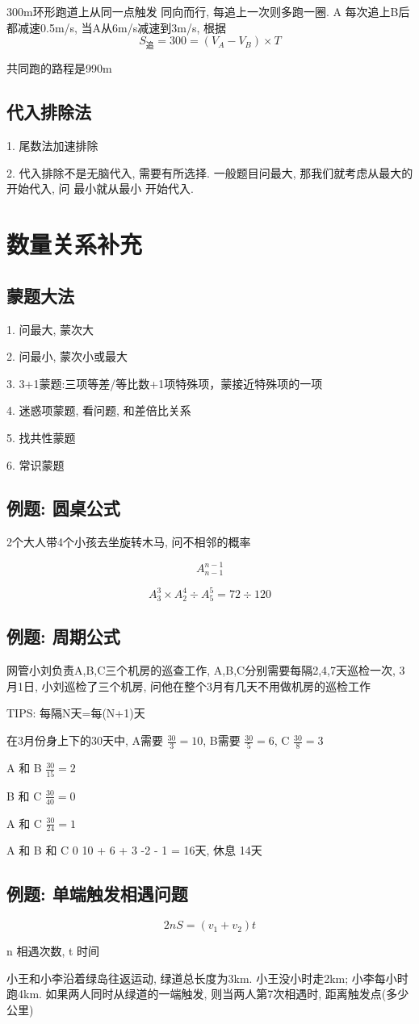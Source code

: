 300m环形跑道上从同一点触发 同向而行, 每追上一次则多跑一圈. A 每次追上B后都减速0.5m/s, 当A从6m/s减速到3m/s,
根据
$$
	S_{追} = 300 = (V_A - V_B) \times T
$$

共同跑的路程是990m

\subsection{代入排除法}
1. 尾数法加速排除

2. 代入排除不是无脑代入, 需要有所选择. 一般题目问最大, 那我们就考虑从最大的开始代入, 问
最小就从最小 开始代入.

\section{数量关系补充}
\subsection{蒙题大法}
1. 问最大, 蒙次大

2. 问最小, 蒙次小或最大

3. 3+1蒙题:三项等差/等比数+1项特殊项，蒙接近特殊项的一项

4. 迷惑项蒙题, 看问题, 和差倍比关系

5. 找共性蒙题

6. 常识蒙题

\subsection{例题: 圆桌公式}
2个大人带4个小孩去坐旋转木马, 问不相邻的概率

$$
	A^{n-1}_{n-1}
$$

$$
	A^{3}_{3} \times A^{4}_{2} \div A^{5}_{5} = 72 \div 120
$$

\subsection{例题: 周期公式}
网管小刘负责A,B,C三个机房的巡查工作, A,B,C分别需要每隔2,4,7天巡检一次, 3月1日, 小刘巡检了三个机房, 问他在整个3月有几天不用做机房的巡检工作

TIPS: 每隔N天=每(N+1)天

在3月份身上下的30天中, A需要  $\frac{30}{3} = 10$, B需要 $\frac{30}{5} = 6$, C $\frac{30}{8} = 3$

A 和 B $\frac{30}{15} = 2$

B 和 C $\frac{30}{40} = 0$

A 和 C $\frac{30}{24} = 1$

A 和 B 和 C 0
10 + 6 + 3 -2 - 1 = 16天, 休息 14天


\subsection{例题: 单端触发相遇问题}

$$
	2nS = (v_1 + v_2) t
$$

n 相遇次数, t 时间

小王和小李沿着绿岛往返运动, 绿道总长度为3km. 小王没小时走2km; 小李每小时跑4km. 如果两人同时从绿道的一端触发, 则当两人第7次相遇时, 距离触发点(多少公里)
